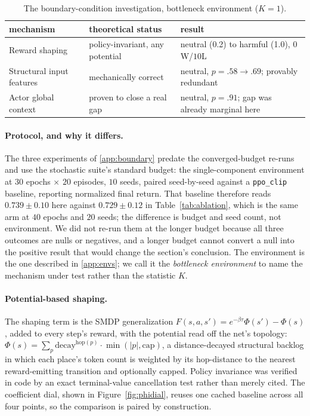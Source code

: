 \documentclass[review,authoryear,3p,times]{elsarticle}
\begin{document}
\begin{table}[tbp]
\centering
\caption{The boundary-condition investigation, bottleneck environment
($K{=}1$).}
\label{tab:boundary}
\begin{tabular}{lll}
\toprule
mechanism & theoretical status & result \\
\midrule
Reward shaping & policy-invariant, any potential & neutral (0.2) to harmful (1.0), $0$W/$10$L \\
Structural input features & mechanically correct & neutral, $p=.58\to.69$; provably redundant \\
Actor global context & proven to close a real gap & neutral, $p=.91$; gap was already marginal here \\
\bottomrule
\end{tabular}
\end{table}

\paragraph{Protocol, and why it differs.} The three experiments of
\ref{app:boundary} predate the converged-budget re-runs and use the
stochastic suite's standard budget: the single-component environment at $30$
epochs $\times$ $20$ episodes, $10$ seeds, paired seed-by-seed against a
\texttt{ppo\_clip} baseline, reporting normalized final return. That baseline
therefore reads $0.739\pm0.10$ here against $0.729\pm0.12$ in
Table~\ref{tab:ablation}, which is the same arm at $40$ epochs and $20$ seeds;
the difference is budget and seed count, not environment. We did not re-run them
at the longer budget because all three outcomes are nulls or negatives, and a
longer budget cannot convert a null into the positive result that would change
the section's conclusion. The environment is the one described in
\ref{app:envs}; we call it the
\emph{bottleneck environment} to name the mechanism under test rather than the
statistic $K$.

\paragraph{Potential-based shaping.} The shaping term is the SMDP
generalization $F(s,a,s')=e^{-\beta\tau}\Phi(s')-\Phi(s)$, added to every step's
reward, with the potential read off the net's topology:
$\Phi(s)=\sum_p \mathrm{decay}^{\mathrm{hop}(p)}\cdot\min(|p|,\mathrm{cap})$,
a distance-decayed structural backlog in which each place's token count is
weighted by its hop-distance to the nearest reward-emitting transition and
optionally capped. Policy invariance \citep{ng1999shaping} was verified in code
by an exact terminal-value cancellation test rather than merely cited. The
coefficient dial, shown in Figure~\ref{fig:phidial}, reuses one cached
baseline across all four points, so the comparison is paired by construction.
\end{document}
